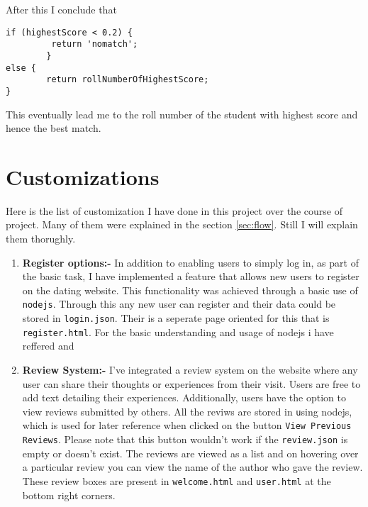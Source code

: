 \documentclass{article}
\begin{document}
After this I conclude that
\begin{lstlisting}[style=JavaScript]
if (highestScore < 0.2) {
         return 'nomatch';
        }
else {
        return rollNumberOfHighestScore;
}

\end{lstlisting}
This eventually lead me to the roll number of the student with highest score and hence the best match.
\section{Customizations} 
Here is the list of customization I have done in this project over the course of project. Many of them were explained in the section \ref{sec:flow}. Still I will explain them thorughly.
\begin{enumerate}
    \item \textbf{Register options:-}
   In addition to enabling users to simply log in, as part of the basic task, I have implemented a feature that allows new users to register on the dating website. This functionality was achieved through a basic use of \texttt{nodejs}. Through this any new user can register and their data could be stored in \texttt{login.json}. Their is a seperate page oriented for this that is \texttt{register.html}. For the basic understanding and usage of nodejs i have reffered \cite{chatgpt} and \cite{nodejs}
   
   \item \textbf{Review System:-}
   \label{sec:review}
   I've integrated a review system on the website where any user can share their thoughts or experiences from their visit. Users are free to add text detailing their experiences. Additionally, users have the option to view reviews submitted by others. All the reviws are stored in \texttt using nodejs, which is used for later reference when clicked on the button \texttt{View Previous Reviews}. Please note that this button wouldn't work if the \texttt{review.json} is empty or doesn't exist. The reviews are viewed as a list and on hovering over a particular review you can view the name of the author who gave the review. These review boxes are present in \texttt{welcome.html} and \texttt{user.html} at the bottom right corners. 
   

\end{enumerate}
\end{document}
